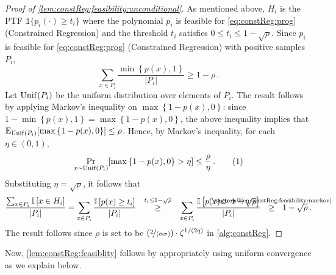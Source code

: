 \documentclass[11pt]{article}
\makeatletter
\theoremstyle{plain}
\theoremstyle{definition}
\theoremstyle{remark}
\newcommand{\yesnum}{\addtocounter{equation}{1}\tag{\theequation}}
\renewcommand{\eqref}[1]{\textup{\eqrefform@{\ref{#1}}}}
\let\eqrefform@\tagform@
\newcommand{\Stackrel}[2]{\stackrel{\mathmakebox[\widthof{\ensuremath{#2}}]{#1}}{#2}}
\def\abs#1{\left| #1 \right|}
\newcommand{\sinbrace}[1]{\{#1\}}
\newcommand{\inbrace}[1]{\left\{#1\right\}}
\newcommand{\inparen}[1]{\left(#1\right)}
\newcommand{\insquare}[1]{\left[#1\right]}
\newcommand{\E}{\operatornamewithlimits{\mathbb{E}}}
\newcommand{\Ex}{\E}
\newcommand{\nfrac}[2]{\nicefrac{#1}{#2}}
\newcommand{\unif}{{\rm Unif}}
\makeatother
\begin{document}
            \begin{proof}[Proof of \cref{lem:constReg:feasibility:unconditional}]
                As mentioned above, $H_i$ is the PTF $\mathds{1}\sinbrace{p_i(\cdot)\geq t_i}$ where the polynomial $p_i$ is feasible for \cref{eq:constReg:prog} (Constrained Regression) and the threshold $t_i$ satisfies $0\leq t_i \leq 1- \sqrt{\rho}$.
                Since $p_i$ is feasible for \cref{eq:constReg:prog} (Constrained Regression) with positive samples $P_i$, 
                \[
                    \sum_{x\in P_i} \frac{\min\inbrace{p(x), 1}}{\abs{P_i}}
                    \geq 1-\rho\,.
                \]
                Let $\unif(P_i)$ be the uniform distribution over elements of $P_i$.
                The result follows by applying Markov's inequality on $\max\inbrace{1-p(x),0}$:
                since $1-\min\inbrace{p(x),1}=\max\inbrace{1-p(x),0}$, the above inequality implies that $\Ex_{\unif(P_i)}[\max\inbrace{1-p(x),0}]\leq \rho$.
                Hence, by Markov's inequality, for each $\eta\in (0,1)$, 
                \[
                    \Pr_{x\sim \unif(P_i)}[\max\inbrace{1-p(x),0} > \eta]\leq \frac{\rho}{\eta}\,.
                    \yesnum\label{eq:constReg:feasibility:markov}
                \]
                Substituting $\eta=\sqrt{\rho}$, it follows that 
                \[
                    \frac{\sum_{x\in P_i} \mathbb{I}\insquare{   x\in H_i } }{\abs{P_i}}
                    =
                    \sum_{x\in P_i} 
                    \frac{\mathbb{I}\insquare{
                        p(x) \geq t_i
                    }}{\abs{P_i}}
                    ~~~~~~\Stackrel{t_i \leq 1-\sqrt{\rho}}{\geq}~~~~~~
                    \sum_{x\in P_i} 
                    \frac{\mathbb{I}\insquare{
                        p(x) > 1 - \sqrt{\rho}
                    }}{\abs{P_i}}
                    ~~\Stackrel{\eqref{eq:constReg:feasibility:markov}}{\geq}~~
                    {1-\sqrt{\rho}}\,.
                \]
                The result follows since $\rho$ is set to be $
                    \inparen{\nfrac{2}{(\alpha\sigma)} }\cdot \zeta^{1/(2q)}
                    $ in \cref{alg:constReg}. 
            \end{proof}
            Now, \cref{lem:constReg:feasiblity} follows by appropriately using uniform convergence as we explain below.
\end{document}
